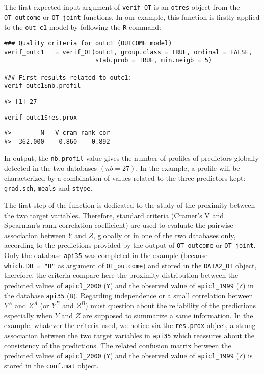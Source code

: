 The first expected input argument of \texttt{verif\_OT} is an \texttt{\textquotesingle{}otres\textquotesingle{}} object from the \texttt{OT\_outcome} or \texttt{OT\_joint} functions. In our example, this function is firstly applied to the \texttt{out\_c1} model by following the \texttt{R} command:

\begin{verbatim}
### Quality criteria for outc1 (OUTCOME model)
verif_outc1   = verif_OT(outc1, group.class = TRUE, ordinal = FALSE, 
                         stab.prob = TRUE, min.neigb = 5)

### First results related to outc1:
verif_outc1$nb.profil
\end{verbatim}

\begin{verbatim}
#> [1] 27
\end{verbatim}

\begin{verbatim}
verif_outc1$res.prox
\end{verbatim}

\begin{verbatim}
#>        N   V_cram rank_cor 
#>  362.000    0.860    0.892
\end{verbatim}

In output, the \texttt{nb.profil} value gives the number of profiles of predictors globally detected in the two databases \((nb = 27)\). In the example, a profile will be characterized by a combination of values related to the three predictors kept: \texttt{grad.sch}, \texttt{meals} and \texttt{stype}.

The first step of the function is dedicated to the study of the proximity between the two target variables. Therefore, standard criteria (Cramer's V and Spearman's rank correlation coefficient) are used to evaluate the pairwise association between \(Y\) and \(Z\), globally or in one of the two databases only, according to the predictions provided by the output of \texttt{OT\_outcome} or \texttt{OT\_joint}. Only the database \texttt{api35} was completed in the example (because \texttt{which.DB\ =\ "B"} as argument of \texttt{OT\_outcome}) and stored in the \texttt{DATA2\_OT} object, therefore, the criteria compare here the proximity distribution between the predicted values of \texttt{apicl\_2000} (\texttt{Y}) and the observed value of \texttt{apicl\_1999} (\texttt{Z}) in the database \texttt{api35} (\texttt{B}). Regarding independence or a small correlation between \(Y^A\) and \(Z^A\) (or \(Y^B\) and \(Z^B\)) must question about the reliability of the predictions especially when \(Y\) and \(Z\) are supposed to summarize a same information. In the example, whatever the criteria used, we notice via the \texttt{res.prox} object, a strong association between the two target variables in \texttt{api35} which reassures about the consistency of the predictions.
The related confusion matrix between the predicted values of \texttt{apicl\_2000} (\texttt{Y}) and the observed value of \texttt{apicl\_1999} (\texttt{Z}) is stored in the \texttt{conf.mat} object.

